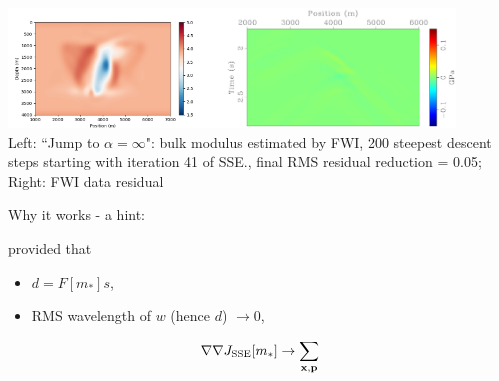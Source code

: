 \documentclass[xcolor=dvipsnames,12pt,aspectratio=169]{beamer}
\begin{document}
\begin{frame}
\begin{center}
\includegraphics[height=1.25in]{Fig/covmestfwicgw41.png}\includegraphics[height=1.25in]{Fig/residcovmestfwicgw41wind.pdf}\\
\vspace{0.25in}
Left: ``Jump to $\alpha=\infty$": bulk modulus estimated by FWI, 200
steepest descent steps starting with iteration 41 of SSE., final RMS residual reduction = 0.05;
Right: FWI data residual 
\end{center}
\end{frame}

\begin{frame}
  Why it works - a hint:

provided that
\begin{itemize}
\item $d = F[m_*]s$,
\item RMS wavelength of $w$ (hence $d$) $\rightarrow 0$,
\end{itemize}
\[
  \nabla \nabla  J_{\rm SSE}[m_*] \rightarrow \sum_{\mathbf{x},\mathbf{p}}
\]
\end{frame}
\end{document}
